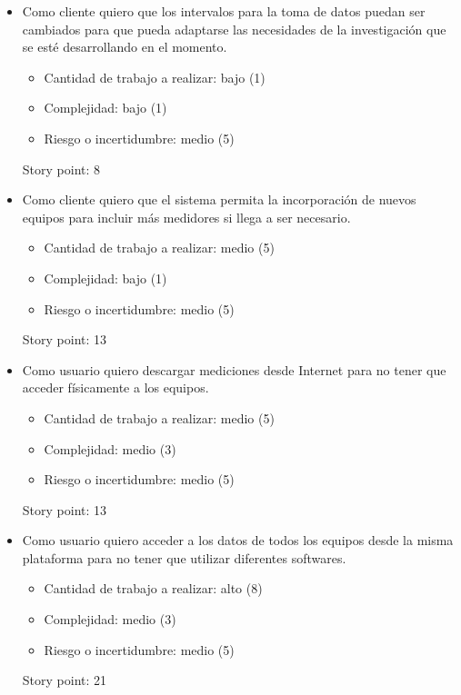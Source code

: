 \documentclass[
11pt, %
codirector, %
]{charter}
\begin{document}
\begin{itemize}

\item Como cliente quiero que los intervalos para la toma de datos puedan ser cambiados para que pueda adaptarse las necesidades de la investigación que se esté desarrollando en el momento.

\begin{itemize}
       \item Cantidad de trabajo a realizar: bajo (1)
       \item Complejidad: bajo (1)
       \item Riesgo o incertidumbre: medio (5)
\end{itemize}
Story point: 8


\item Como cliente quiero que el sistema permita la incorporación de nuevos equipos para incluir más medidores si llega a ser necesario.

\begin{itemize}
       \item Cantidad de trabajo a realizar: medio (5)
       \item Complejidad: bajo (1)
       \item Riesgo o incertidumbre: medio (5)
\end{itemize}
Story point: 13

\item Como usuario quiero descargar mediciones desde Internet para no tener que acceder físicamente a los equipos.

\begin{itemize}
       \item Cantidad de trabajo a realizar: medio (5)
       \item Complejidad: medio (3)
       \item Riesgo o incertidumbre: medio (5)
\end{itemize}
Story point: 13


\item Como usuario quiero acceder a los datos de todos los equipos desde la misma plataforma para no tener que utilizar diferentes softwares. 

\begin{itemize}
       \item Cantidad de trabajo a realizar: alto (8)
       \item Complejidad: medio (3)
       \item Riesgo o incertidumbre: medio (5)
\end{itemize}
Story point: 21

\end{itemize}
\end{document}
